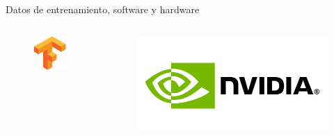 \documentclass[12pt,aspectratio=169]{beamer}
\begin{document}
\begin{frame}{Datos de entrenamiento, software y hardware}
\begin{columns}[c]
            \vspace*{-4mm}
            \begin{figure}
                \includegraphics[scale=0.3]{figs/tensorflow.png}
            \end{figure}
            \vspace*{-7mm}
            \begin{figure}
                \includegraphics[scale=0.06]{figs/nvidia.png}
            \end{figure}
    \end{columns}

\end{frame}
\end{document}
